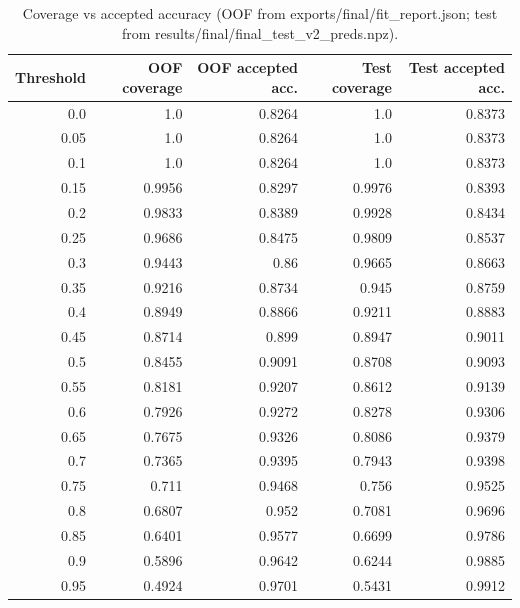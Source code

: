 \begin{table}[t]
\centering\small
\caption{Coverage vs accepted accuracy (OOF from exports/final/fit\_report.json; test from results/final/final\_test\_v2\_preds.npz).}
\label{tab:abstention}
\begin{tabular}{rrrrr}
\toprule
Threshold & OOF coverage & OOF accepted acc. & Test coverage & Test accepted acc. \\
\midrule
0.0 & 1.0 & 0.8264 & 1.0 & 0.8373 \\
0.05 & 1.0 & 0.8264 & 1.0 & 0.8373 \\
0.1 & 1.0 & 0.8264 & 1.0 & 0.8373 \\
0.15 & 0.9956 & 0.8297 & 0.9976 & 0.8393 \\
0.2 & 0.9833 & 0.8389 & 0.9928 & 0.8434 \\
0.25 & 0.9686 & 0.8475 & 0.9809 & 0.8537 \\
0.3 & 0.9443 & 0.86 & 0.9665 & 0.8663 \\
0.35 & 0.9216 & 0.8734 & 0.945 & 0.8759 \\
0.4 & 0.8949 & 0.8866 & 0.9211 & 0.8883 \\
0.45 & 0.8714 & 0.899 & 0.8947 & 0.9011 \\
0.5 & 0.8455 & 0.9091 & 0.8708 & 0.9093 \\
0.55 & 0.8181 & 0.9207 & 0.8612 & 0.9139 \\
0.6 & 0.7926 & 0.9272 & 0.8278 & 0.9306 \\
0.65 & 0.7675 & 0.9326 & 0.8086 & 0.9379 \\
0.7 & 0.7365 & 0.9395 & 0.7943 & 0.9398 \\
0.75 & 0.711 & 0.9468 & 0.756 & 0.9525 \\
0.8 & 0.6807 & 0.952 & 0.7081 & 0.9696 \\
0.85 & 0.6401 & 0.9577 & 0.6699 & 0.9786 \\
0.9 & 0.5896 & 0.9642 & 0.6244 & 0.9885 \\
0.95 & 0.4924 & 0.9701 & 0.5431 & 0.9912 \\
\bottomrule
\end{tabular}
\end{table}
